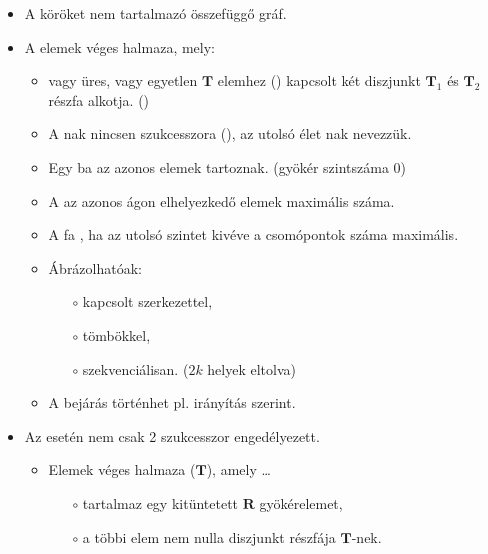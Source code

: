 \documentclass[../../main.tex]{subfiles}
\begin{document}
\begin{itemize}
	\item A  köröket nem tartalmazó összefüggő gráf.

	\item A  elemek véges halmaza, mely:
	      \begin{itemize}
		      \item vagy üres, vagy egyetlen $\mathbf{T}$ elemhez ()
		            kapcsolt két diszjunkt $\mathbf{T}_1$ és $\mathbf{T}_2$
		            részfa alkotja. ()

		      \item A nak nincsen szukcesszora
		            (), az utolsó élet nak nevezzük.

		      \item Egy ba az azonos  elemek tartoznak.
		            (gyökér szintszáma 0)

		      \item A  az azonos ágon elhelyezkedő elemek maximális száma.

		      \item A fa , ha az utolsó szintet kivéve
		            a csomópontok száma maximális.

		      \item Ábrázolhatóak:
		            \begin{itemize}
			            \item[$\circ$] kapcsolt szerkezettel,
			            \item[$\circ$] tömbökkel,
			            \item[$\circ$] szekvenciálisan. ($2k$ helyek eltolva)
		            \end{itemize}

		      \item A bejárás történhet pl. irányítás szerint.
	      \end{itemize}

	\item Az  esetén nem csak 2 szukcesszor engedélyezett.
	      \begin{itemize}
		      \item Elemek véges halmaza ($\mathbf{T}$), amely \dots
		            \begin{itemize}
			            \item[$\circ$] tartalmaz egy kitüntetett
				            $\mathbf{R}$ gyökérelemet,
			            \item[$\circ$] a többi elem nem nulla diszjunkt
				            részfája $\mathbf{T}$-nek.
		            \end{itemize}
	      \end{itemize}


\end{itemize}
\end{document}
